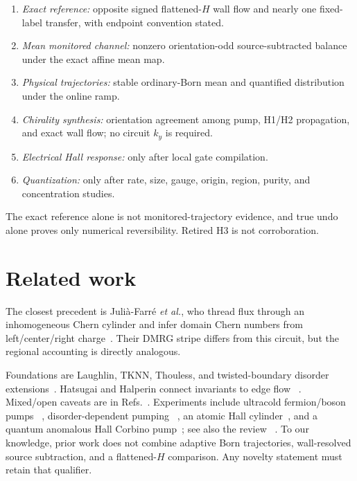\documentclass[aps,prb,onecolumn,nofootinbib,superscriptaddress]{revtex4-2}
\begin{document}
\begin{enumerate}
 \item \emph{Exact reference:} opposite signed flattened-$H$ wall flow and
 nearly one fixed-label transfer, with endpoint convention stated.
 \item \emph{Mean monitored channel:} nonzero orientation-odd source-subtracted
 balance under the exact affine mean map.
 \item \emph{Physical trajectories:} stable ordinary-Born mean and quantified
 distribution under the online ramp.
 \item \emph{Chirality synthesis:} orientation agreement among pump, H1/H2
 propagation, and exact wall flow; no circuit $k_y$ is required.
 \item \emph{Electrical Hall response:} only after local gate compilation.
 \item \emph{Quantization:} only after rate, size, gauge, origin, region,
 purity, and concentration studies.
\end{enumerate}
The exact reference alone is not monitored-trajectory evidence, and true undo
alone proves only numerical reversibility.  Retired H3 is not corroboration.

\section{Related work}

The closest precedent is Juli\`a-Farr\'e \emph{et al.}, who thread flux through
an inhomogeneous Chern cylinder and infer domain Chern numbers from
left/center/right charge~\cite{JuliaFarre2024}.  Their DMRG stripe differs from
this circuit, but the regional accounting is directly analogous.

Foundations are Laughlin, TKNN, Thouless, and twisted-boundary disorder
extensions~\cite{Laughlin1981,TKNN1982,Thouless1983,NiuThouless1984,NiuThoulessWu1985}.
Hatsugai and Halperin connect invariants to edge flow
~\cite{Hatsugai1993,Halperin1982}.  Mixed/open caveats are in
Refs.~\cite{BudichDiehl2015,Bardyn2018,Linzner2016,Avron2012}.
Experiments include ultracold fermion/boson pumps
~\cite{Nakajima2016,Lohse2016}, disorder-dependent pumping
~\cite{Nakajima2021}, an atomic Hall cylinder~\cite{Fabre2022}, and a quantum
anomalous Hall Corbino pump~\cite{Kawamura2023}; see also the review
~\cite{CitroAidelsburger2023}.  To our knowledge, prior work does not combine
adaptive Born trajectories, wall-resolved source subtraction, and a
flattened-$H$ comparison.  Any novelty statement must retain that qualifier.
\end{document}
